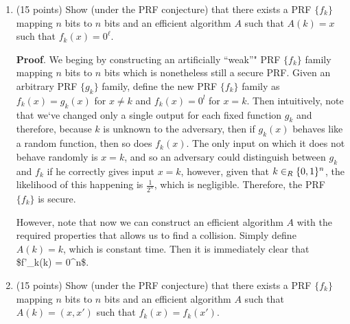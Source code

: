 \documentclass{article}
\begin{document}
\begin{enumerate}%

\item{}
(15 points) Show (under the PRF conjecture) that there exists a PRF $\{ f_k \}$ mapping $n$ bits to $n$ bits and an efficient algorithm $A$ such that
$A(k)=x$ such that $f_k(x)=0^\ell$.%

\begin{mdbmarginx}{1ex}{0pt}{1ex}{0pt}%
\noindent{}\textbf{Proof}.   We beging by constructing an artificially \textquotedblleft{}weak\textquotedblright{}" PRF $\{f_k \}$ family mapping $n$ bits to $n$
 bits which is nonetheless still a secure PRF. Given an arbitrary PRF $\{g_k \}$ family, define 
 the new PRF $\{f_k \}$ family as $f_k(x) = g_k(x)$ for $x \neq k$ and $f_k(x) = 0^l$ for $x = k$.
 Then intuitively, note that we\textquoteleft{}ve changed only a single output for each fixed function $g_k$
 and therefore, because $k$ is unknown to the adversary, then if $g_k(x)$ behaves like a random 
 function, then so does $f_k(x)$. The only input on which it does not behave randomly is $x =k$,
 and so an adversary could distinguish between $g_k$ and $f_k$ if he correctly gives input
 $x = k$, however, given that $k \in_R \{0,1\}^n$, the likelihood of this happening is $\frac{1}{2^n}$, 
 which is negligible. Therefore, the PRF $\{f_k \}$ is secure.
 
 However, note that now we can construct an efficient algorithm $A$ with the required properties
 that allows us to find a collision.  Simply define $A(k) = k$, which is constant time. Then it
 is immediately clear that \$f\textquoteright{}\_k(k) = 0\textasciicircum{}n\$.%
\end{mdbmarginx}%

\item{}
(15 points) Show (under the PRF conjecture) that there exists a PRF $\{ f_k \}$ mapping $n$ bits to $n$ bits and an efficient algorithm $A$ such that
$A(k)=(x,x')$ such that $f_k(x)=f_k(x')$.%


\end{enumerate}
\end{document}
